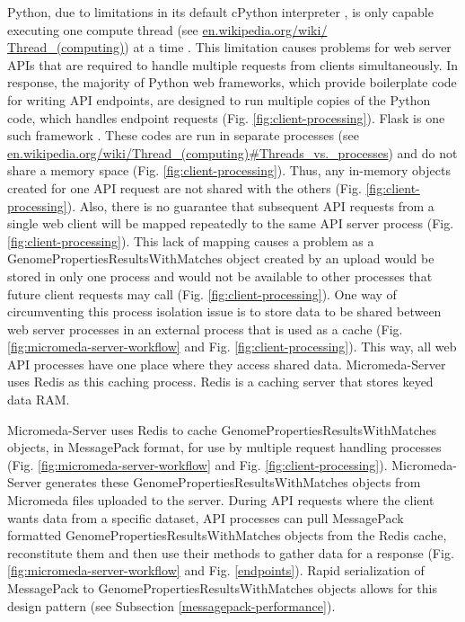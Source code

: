 Python, due to limitations in its default cPython interpreter \cite{van1995python}, is only capable executing one compute thread \cite{saltzer1966traffic} (see \href{en.wikipedia.org/wiki/Thread\_(computing)}{en.wikipedia.org/wiki/ \\ Thread\_(computing)}) at a time \cite{beazley2010understanding}. This limitation causes problems for web server APIs that are required to handle multiple requests from clients simultaneously. In response, the majority of Python web frameworks, which provide boilerplate code for writing API endpoints, are designed to run multiple copies of the Python code, which handles endpoint requests (Fig. \ref{fig:client-processing}). Flask is one such framework \cite{grinberg2018flask}. These codes are run in separate processes (see \href{en.wikipedia.org/wiki/Thread\_(computing)\#Threads\_vs.\_processes}{en.wikipedia.org/wiki/Thread\_(computing)\#Threads\_vs.\_processes}) and do not share a memory space (Fig. \ref{fig:client-processing}). Thus, any in-memory objects created for one API request are not shared with the others (Fig. \ref{fig:client-processing}). Also, there is no guarantee that subsequent API requests from a single web client will be mapped repeatedly to the same API server process (Fig. \ref{fig:client-processing}). This lack of mapping causes a problem as a GenomePropertiesResultsWithMatches object created by an upload would be stored in only one process and would not be available to other processes that future client requests may call (Fig. \ref{fig:client-processing}). One way of circumventing this process isolation issue is to store data to be shared between web server processes in an external process that is used as a cache (Fig. \ref{fig:micromeda-server-workflow} and Fig. \ref{fig:client-processing}). This way, all web API processes have one place where they access shared data. Micromeda-Server uses Redis as this caching process. Redis is a caching server that stores keyed data RAM. 

Micromeda-Server uses Redis to cache GenomePropertiesResultsWithMatches objects, in MessagePack format, for use by multiple request handling processes (Fig. \ref{fig:micromeda-server-workflow} and Fig. \ref{fig:client-processing}). Micromeda-Server generates these GenomePropertiesResultsWithMatches objects from Micromeda files uploaded to the server. During API requests where the client wants data from a specific dataset, API processes can pull MessagePack formatted GenomePropertiesResultsWithMatches objects from the Redis cache, reconstitute them and then use their methods to gather data for a response (Fig. \ref{fig:micromeda-server-workflow} and Fig. \ref{endpoints}). Rapid serialization of MessagePack to GenomePropertiesResultsWithMatches objects allows for this design pattern (see Subsection \ref{messagepack-performance}).

